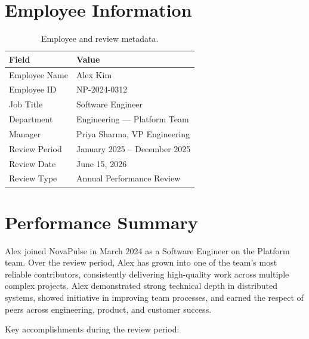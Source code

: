 \documentclass[
    language=english,
    doctype=performance-review,
    institution=none,
]{../../omnilatex}
\begin{document}
\maketitle

\section*{Employee Information}

\begin{table}[h]
    \centering
    \begin{tabular}{ll}
        \toprule
        \textbf{Field} & \textbf{Value} \\
        \midrule
        Employee Name   & Alex Kim \\
        Employee ID     & NP-2024-0312 \\
        Job Title       & Software Engineer \\
        Department      & Engineering --- Platform Team \\
        Manager         & Priya Sharma, VP Engineering \\
        Review Period   & January 2025 -- December 2025 \\
        Review Date     & June 15, 2026 \\
        Review Type     & Annual Performance Review \\
        \bottomrule
    \end{tabular}
    \caption{Employee and review metadata.}
\end{table}

\section{Performance Summary}

Alex joined NovaPulse in March 2024 as a Software Engineer on the Platform
team. Over the review period, Alex has grown into one of the team's most
reliable contributors, consistently delivering high-quality work across
multiple complex projects. Alex demonstrated strong technical depth in
distributed systems, showed initiative in improving team processes, and
earned the respect of peers across engineering, product, and customer success.

Key accomplishments during the review period:
\end{document}
